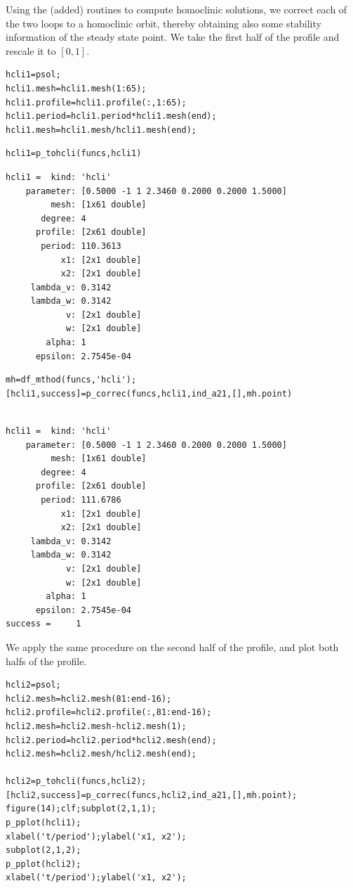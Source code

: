 \documentclass[10pt]{scrartcl}
\begin{document}
Using the (added) routines to compute homoclinic solutions, we
correct each of the two loops to a homoclinic orbit, thereby obtaining
also some stability information of the steady state point.
We take the first half of the profile and rescale it to $[0,1]$.
\begin{lstlisting}
hcli1=psol;
hcli1.mesh=hcli1.mesh(1:65);
hcli1.profile=hcli1.profile(:,1:65);
hcli1.period=hcli1.period*hcli1.mesh(end);
hcli1.mesh=hcli1.mesh/hcli1.mesh(end);  
\end{lstlisting}
\begin{lstlisting}
hcli1=p_tohcli(funcs,hcli1)
\end{lstlisting}
{\small
\begin{verbatim}
hcli1 =  kind: 'hcli'
    parameter: [0.5000 -1 1 2.3460 0.2000 0.2000 1.5000]
         mesh: [1x61 double]
       degree: 4
      profile: [2x61 double]
       period: 110.3613
           x1: [2x1 double]
           x2: [2x1 double]
     lambda_v: 0.3142
     lambda_w: 0.3142
            v: [2x1 double]
            w: [2x1 double]
        alpha: 1
      epsilon: 2.7545e-04
\end{verbatim}
}
\begin{lstlisting}
mh=df_mthod(funcs,'hcli');
[hcli1,success]=p_correc(funcs,hcli1,ind_a21,[],mh.point)
\end{lstlisting}
{\small
\begin{verbatim}

hcli1 =  kind: 'hcli'
    parameter: [0.5000 -1 1 2.3460 0.2000 0.2000 1.5000]
         mesh: [1x61 double]
       degree: 4
      profile: [2x61 double]
       period: 111.6786
           x1: [2x1 double]
           x2: [2x1 double]
     lambda_v: 0.3142
     lambda_w: 0.3142
            v: [2x1 double]
            w: [2x1 double]
        alpha: 1
      epsilon: 2.7545e-04
success =     1
\end{verbatim}
} We apply the same procedure on the second half of the profile, and
plot both halfs of the profile.
\begin{lstlisting}
hcli2=psol;
hcli2.mesh=hcli2.mesh(81:end-16);
hcli2.profile=hcli2.profile(:,81:end-16);
hcli2.mesh=hcli2.mesh-hcli2.mesh(1);
hcli2.period=hcli2.period*hcli2.mesh(end);
hcli2.mesh=hcli2.mesh/hcli2.mesh(end);

hcli2=p_tohcli(funcs,hcli2);
[hcli2,success]=p_correc(funcs,hcli2,ind_a21,[],mh.point);
figure(14);clf;subplot(2,1,1);
p_pplot(hcli1);
xlabel('t/period');ylabel('x1, x2');
subplot(2,1,2);
p_pplot(hcli2);
xlabel('t/period');ylabel('x1, x2');  
\end{lstlisting}
\end{document}
